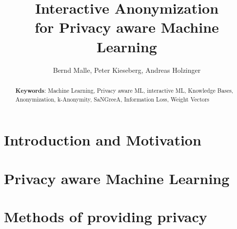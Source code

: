 \documentclass{llncs}
\begin{document}
\title{Interactive Anonymization\\
for Privacy aware Machine Learning}

\author{Bernd Malle, Peter Kieseberg, Andreas Holzinger}

	
\maketitle

\begin{abstract}




\medskip

\textbf{Keywords}: Machine Learning, Privacy aware ML, interactive ML, Knowledge Bases, Anonymization, k-Anonymity, SaNGreeA, Information Loss, Weight Vectors


\end{abstract}

\renewcommand{\thesubfigure}{\thefigure.\arabic{subfigure}}
\makeatletter
\renewcommand{\p@subfigure}{}
\renewcommand{\@thesubfigure}{\thesubfigure:\hskip\subfiglabelskip}
\makeatother


\section{Introduction and Motivation}
\label{sect:intro_moti}


\section{Privacy aware Machine Learning}
\label{sect:paml}


\section{Methods of providing privacy}
\label{sect:methods_privacy}
\end{document}
